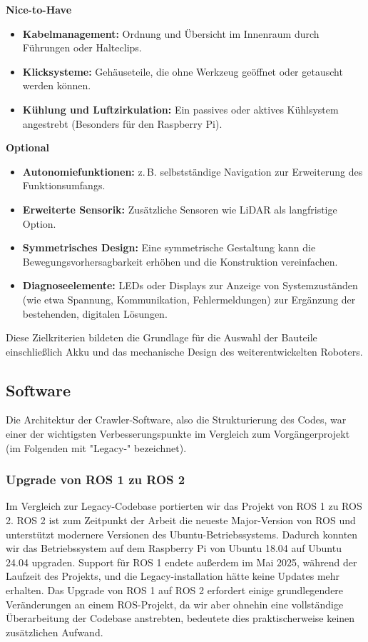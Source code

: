 \textbf{Nice-to-Have}
\begin{itemize}
  \item \textbf{Kabelmanagement:} Ordnung und Übersicht im Innenraum durch Führungen oder Halteclips.
  \item \textbf{Klicksysteme:} Gehäuseteile, die ohne Werkzeug geöffnet oder getauscht werden können.
  \item \textbf{Kühlung und Luftzirkulation:} Ein passives oder aktives Kühlsystem angestrebt (Besonders für den Raspberry Pi).
\end{itemize}

\textbf{Optional}
\begin{itemize}
  \item \textbf{Autonomiefunktionen:} z.\,B. selbstständige Navigation zur Erweiterung des Funktionsumfangs.
  \item \textbf{Erweiterte Sensorik:} Zusätzliche Sensoren wie LiDAR als langfristige Option.
  \item \textbf{Symmetrisches Design:} Eine symmetrische Gestaltung kann die Bewegungsvorhersagbarkeit erhöhen und die Konstruktion vereinfachen.
  \item \textbf{Diagnoseelemente:} LEDs oder Displays zur Anzeige von Systemzuständen (wie etwa Spannung, Kommunikation, Fehlermeldungen) zur Ergänzung der bestehenden, digitalen Lösungen.
\end{itemize}

Diese Zielkriterien bildeten die Grundlage für die Auswahl der Bauteile einschließlich Akku und das mechanische Design des weiterentwickelten Roboters.

\subsection{Software}

Die Architektur der Crawler-Software, also die Strukturierung des Codes, war einer der wichtigsten Verbesserungspunkte im Vergleich zum Vorgängerprojekt (im Folgenden mit "Legacy-" bezeichnet). 

\subsubsection{Upgrade von ROS 1 zu ROS 2}

Im Vergleich zur Legacy-Codebase portierten wir das Projekt von ROS 1 zu ROS 2. ROS 2 ist zum Zeitpunkt der Arbeit die neueste Major-Version von ROS und unterstützt modernere Versionen des Ubuntu-Betriebssystems. Dadurch konnten wir das Betriebssystem auf dem Raspberry Pi von Ubuntu 18.04 auf Ubuntu 24.04 upgraden. Support für ROS 1 endete außerdem im Mai 2025, während der Laufzeit des Projekts, und die Legacy-installation hätte keine Updates mehr erhalten. Das Upgrade von ROS 1 auf ROS 2 erfordert einige grundlegendere Veränderungen an einem ROS-Projekt, da wir aber ohnehin eine vollständige Überarbeitung der Codebase anstrebten, bedeutete dies praktischerweise keinen zusätzlichen Aufwand. 

